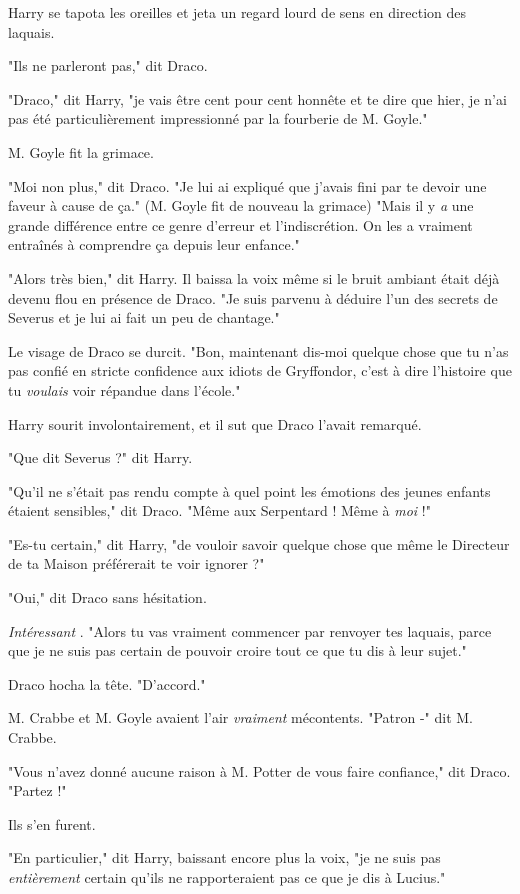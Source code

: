 Harry se tapota les oreilles et jeta un regard lourd de sens en direction des laquais.

"Ils ne parleront pas," dit Draco.

"Draco," dit Harry, "je vais être cent pour cent honnête et te dire que hier, je n'ai pas été particulièrement impressionné par la fourberie de M. Goyle."

M. Goyle fit la grimace.

"Moi non plus," dit Draco. "Je lui ai expliqué que j'avais fini par te devoir une faveur à cause de ça." (M. Goyle fit de nouveau la grimace) "Mais il y \emph{a}  une grande différence entre ce genre d'erreur et l'indiscrétion. On les a vraiment entraînés à comprendre ça depuis leur enfance."

"Alors très bien," dit Harry. Il baissa la voix même si le bruit ambiant était déjà devenu flou en présence de Draco. "Je suis parvenu à déduire l'un des secrets de Severus et je lui ai fait un peu de chantage."

Le visage de Draco se durcit. "Bon, maintenant dis-moi quelque chose que tu n'as pas confié en stricte confidence aux idiots de Gryffondor, c'est à dire l'histoire que tu \emph{voulais}  voir répandue dans l'école."

Harry sourit involontairement, et il sut que Draco l'avait remarqué.

"Que dit Severus ?" dit Harry.

"Qu'il ne s'était pas rendu compte à quel point les émotions des jeunes enfants étaient sensibles," dit Draco. "Même aux Serpentard ! Même à \emph{moi}  !"

"Es-tu certain," dit Harry, "de vouloir savoir quelque chose que même le Directeur de ta Maison préférerait te voir ignorer ?"

"Oui," dit Draco sans hésitation.

\emph{Intéressant} . "Alors tu vas vraiment commencer par renvoyer tes laquais, parce que je ne suis pas certain de pouvoir croire tout ce que tu dis à leur sujet."

Draco hocha la tête. "D'accord."

M. Crabbe et M. Goyle avaient l'air \emph{vraiment}  mécontents. "Patron -" dit M. Crabbe.

"Vous n'avez donné aucune raison à M. Potter de vous faire confiance," dit Draco. "Partez !"

Ils s'en furent.

"En particulier," dit Harry, baissant encore plus la voix, "je ne suis pas \emph{entièrement}  certain qu'ils ne rapporteraient pas ce que je dis à Lucius."

